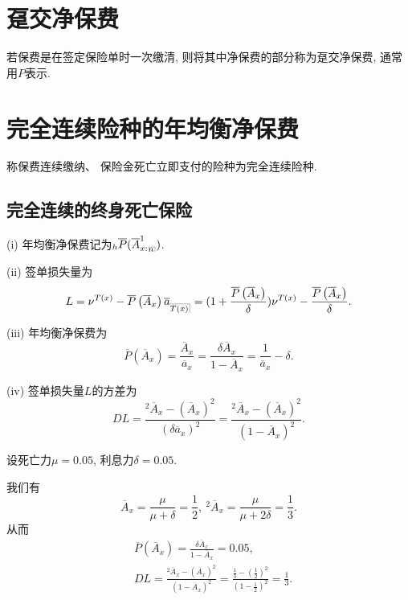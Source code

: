 \documentclass[lang=cn,10pt]{elegantbook}
\makeatletter
\DeclareRobustCommand{\annu}[1]{_{%
    \def\arraystretch{0}%
    \setlength\arraycolsep{1pt}%
    \setlength\arrayrulewidth{.2pt}%
    \begin{array}[b]{@{}c|}\hline
        \\[\arraycolsep]%
        \scriptstyle #1%
    \end{array}%
}}
\makeatother
\begin{document}
\section{趸交净保费}
\begin{definition}[趸交净保费]
    若保费是在签定保险单时一次缴清, 则将其中净保费的部分称为趸交净保费, 通常用$P$表示.
\end{definition}

\section{完全连续险种的年均衡净保费}
\begin{definition}
    称保费连续缴纳、 保险金死亡立即支付的险种为完全连续险种.
\end{definition}
\subsection{完全连续的终身死亡保险}
\begin{proposition}
    (i) 年均衡净保费记为${}_{h}\overline{P}(\overline{A}^{1}_{x:}{}_{\annu n})$.
    
    (ii) 签单损失量为
$$L=\nu^{T(x)}-\overline{P}\left( \overline{A}_x \right)\overline a_{\annu {T(x)}}=(1+\frac{\overline{P}\left( \overline{A}_x \right)}{\delta})\nu^{T(x)}-\frac{\overline{P}\left( \overline{A}_x \right)}{\delta}.$$

(iii) 年均衡净保费为$$\overline{P}\left( \overline{A}_x \right)=\frac{\overline A_x}{\overline a_x}=\frac{\delta\overline A_x}{1-\overline A_x}=\frac{1}{\overline a_x}-\delta.$$

(iv) 签单损失量$L$的方差为
$$DL=\frac{^2\overline A_x-(\overline A_x)^2}{(\delta\overline a_x)^2}=\frac{^2\overline A_x-(\overline A_x)^2}{(1-\overline A_x)^2}.$$
\end{proposition}

\begin{example}
    设死亡力$\mu=0.05$, 利息力$\delta=0.05.$
 \end{example}
 \begin{solution}
    我们有
 $$\overline A_x=\frac{\mu}{\mu+\delta}=\frac{1}{2},\ {}^2\overline A_x=\frac{\mu}{\mu+2\delta}=\frac{1}{3}.$$
 从而
 \begin{align*}
   &\overline{P}\left( \overline{A}_x \right)=\frac{\delta\overline A_x}{1-\overline A_x}=0.05,\\
 &DL=\frac{^2\overline A_x-(\overline A_x)^2}{(1-\overline A_x)^2}=\frac{\frac{1}{3}-(\frac{1}{2})^2}{(1-\frac{1}{2})^2}=\frac{1}{3}.
 \end{align*}

\end{solution}
\end{document}
